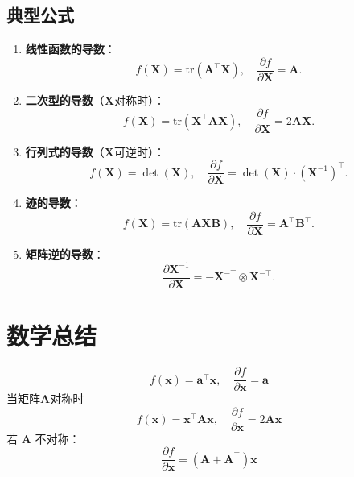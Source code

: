 \documentclass[lang=cn,11pt,a4paper]{elegantpaper}
\begin{document}
\subsection{典型公式}
\begin{enumerate}
    \item \textbf{线性函数的导数}：
    \[
    f(\bm{X}) = \mathrm{tr}(\bm{A}^\top \bm{X}), \quad \frac{\partial f}{\partial \bm{X}} = \bm{A}.
    \]
    
    \item \textbf{二次型的导数}（\(\bm{X}\)对称时）：
    \[
    f(\bm{X}) = \mathrm{tr}(\bm{X}^\top \bm{A} \bm{X}), \quad \frac{\partial f}{\partial \bm{X}} = 2\bm{A}\bm{X}.
    \]
    
    \item \textbf{行列式的导数}（\(\bm{X}\)可逆时）：
    \[
    f(\bm{X}) = \det(\bm{X}), \quad \frac{\partial f}{\partial \bm{X}} = \det(\bm{X}) \cdot (\bm{X}^{-1})^\top.
    \]
    
    \item \textbf{迹的导数}：
    \[
    f(\bm{X}) = \mathrm{tr}(\bm{A} \bm{X} \bm{B}), \quad \frac{\partial f}{\partial \bm{X}} = \bm{A}^\top \bm{B}^\top.
    \]
    
    \item \textbf{矩阵逆的导数}：
    \[
    \frac{\partial \bm{X}^{-1}}{\partial \bm{X}} = -\bm{X}^{-\top} \otimes \bm{X}^{-\top}.
    \]
\end{enumerate}

\section{数学总结}
\begin{equation}
    f(\mathbf{x}) = \mathbf{a}^\top \mathbf{x}, \quad 
    \frac{\partial f}{\partial \mathbf{x}} = \mathbf{a}
\end{equation}
当矩阵\(\mathbf{A}\)对称时
\begin{equation}
    f(\mathbf{x}) = \mathbf{x}^\top \mathbf{A} \mathbf{x}, \quad 
    \frac{\partial f}{\partial \mathbf{x}} = 2\mathbf{A}\mathbf{x}
\end{equation}
若 \(\mathbf{A}\) 不对称：
\begin{equation}
    \frac{\partial f}{\partial \mathbf{x}} = (\mathbf{A} + \mathbf{A}^\top) \mathbf{x}
\end{equation}
\end{document}
